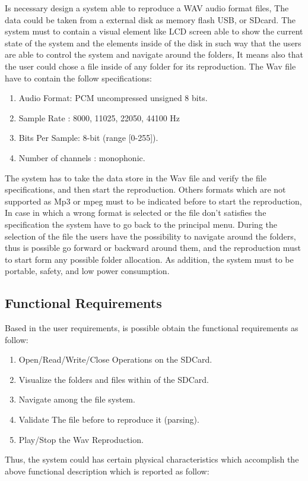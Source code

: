 Is necessary design a system able to reproduce a WAV audio format files, The data could be taken from a external disk as memory flash USB, or SDcard.  The system must to contain a visual element like LCD screen able to show the current state of the system and the elements inside of the disk in such way that the users are able to control the system and navigate around the folders, It means also that the user could chose a file inside of any folder for its reproduction. 
\newline
\newline
The Wav file have to contain the follow specifications:
\begin{enumerate}
\item Audio Format: PCM  uncompressed unsigned 8 bits.
\item Sample Rate :  8000,	11025, 22050, 44100 Hz
\item Bits Per Sample: 8-bit (range [0-255]).
\item Number of channels : monophonic.
\end{enumerate}
The system has to take the data store in the Wav file and verify the file specifications, and then start the reproduction. Others formats which are not supported as Mp3 or mpeg must to be indicated before to start the reproduction, In case in which a wrong format is selected or  the file don't satisfies the specification the system have to go back to the principal menu.
\newline
\newline
During the selection of the file the users have the possibility to navigate around the folders, thus is possible go forward or backward around them, and the reproduction must to start form any possible folder allocation. As addition, the system must to be portable, safety, and low power consumption.

\subsection{Functional Requirements}
Based in the user requirements, is possible obtain the functional requirements as follow:

\begin{enumerate}
\item Open/Read/Write/Close Operations on the SDCard.
\item Visualize the folders and files within of the SDCard.
\item Navigate  among the file system.
\item Validate The file before to reproduce it (parsing). 
\item Play/Stop the Wav Reproduction.
\end{enumerate}
Thus, the system could has certain physical characteristics which accomplish the above functional description which is reported as follow:

